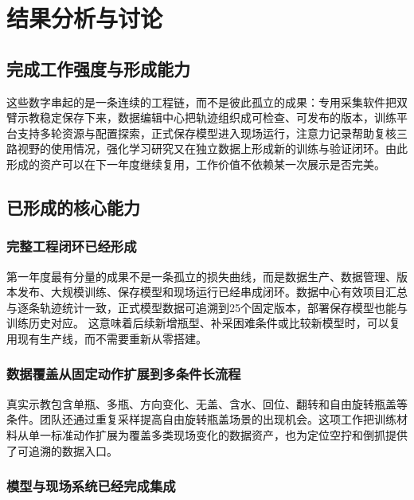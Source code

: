 \chapter{结果分析与讨论}

\section{完成工作强度与形成能力}


这些数字串起的是一条连续的工程链，而不是彼此孤立的成果：专用采集软件把双臂示教稳定保存下来，数据编辑中心把轨迹组织成可检查、可发布的版本，训练平台支持多轮资源与配置探索，正式保存模型进入现场运行，注意力记录帮助复核三路视野的使用情况，强化学习研究又在独立数据上形成新的训练与验证闭环。由此形成的资产可以在下一年度继续复用，工作价值不依赖某一次展示是否完美。

\section{已形成的核心能力}

\subsection{完整工程闭环已经形成}

第一年度最有分量的成果不是一条孤立的损失曲线，而是数据生产、数据管理、版本发布、大规模训练、保存模型和现场运行已经串成闭环。数据中心有效项目汇总与逐条轨迹统计一致，正式模型数据可追溯到25个固定版本，部署保存模型也能与训练历史对应。 这意味着后续新增瓶型、补采困难条件或比较新模型时，可以复用现有生产线，而不需要重新从零搭建。

\subsection{数据覆盖从固定动作扩展到多条件长流程}

真实示教包含单瓶、多瓶、方向变化、无盖、含水、回位、翻转和自由旋转瓶盖等条件。团队还通过重复采样提高自由旋转瓶盖场景的出现机会。这项工作把训练材料从单一标准动作扩展为覆盖多类现场变化的数据资产，也为定位空拧和倒抓提供了可追溯的数据入口。

\subsection{模型与现场系统已经完成集成}

